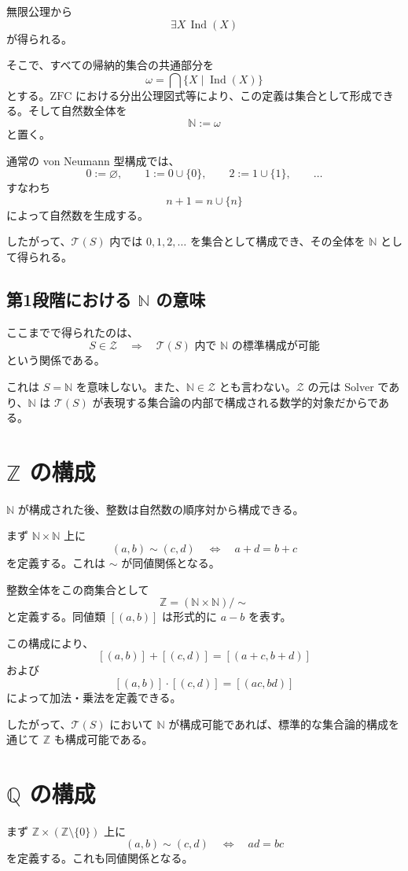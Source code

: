 \documentclass[a4paper,11pt]{article}
\newcommand{\ZFC}{\mathrm{ZFC}}
\begin{document}
無限公理から
\[
\exists X\,\operatorname{Ind}(X)
\]
が得られる。

そこで、すべての帰納的集合の共通部分を
\[
\omega=\bigcap\{X\mid\operatorname{Ind}(X)\}
\]
とする。$\ZFC$ における分出公理図式等により、この定義は集合として形成できる。そして自然数全体を
\[
\boxed{\mathbb{N}:=\omega}
\]
と置く。

通常の von Neumann 型構成では、
\[
0:=\varnothing,\qquad 1:=0\cup\{0\},\qquad 2:=1\cup\{1\},\qquad\ldots
\]
すなわち
\[
n+1=n\cup\{n\}
\]
によって自然数を生成する。

したがって、$\mathcal{T}(S)$ 内では $0,1,2,\ldots$ を集合として構成でき、その全体を $\mathbb{N}$ として得られる。

\subsection{第1段階における $\mathbb{N}$ の意味}
ここまでで得られたのは、
\[
S\in\mathcal{Z}\quad\Longrightarrow\quad\mathcal{T}(S)\text{ 内で }\mathbb{N}\text{ の標準構成が可能}
\]
という関係である。

これは $S=\mathbb{N}$ を意味しない。また、$\mathbb{N}\in\mathcal{Z}$ とも言わない。$\mathcal{Z}$ の元は Solver であり、$\mathbb{N}$ は $\mathcal{T}(S)$ が表現する集合論の内部で構成される数学的対象だからである。

\section{$\mathbb{Z}$ の構成}
$\mathbb{N}$ が構成された後、整数は自然数の順序対から構成できる。

まず $\mathbb{N}\times\mathbb{N}$ 上に
\[
(a,b)\sim(c,d)\quad\Longleftrightarrow\quad a+d=b+c
\]
を定義する。これは $\sim$ が同値関係となる。

整数全体をこの商集合として
\[
\boxed{\mathbb{Z}=(\mathbb{N}\times\mathbb{N})/{\sim}}
\]
と定義する。同値類 $[(a,b)]$ は形式的に $a-b$ を表す。

この構成により、
\[
[(a,b)]+[(c,d)]=[(a+c,b+d)]
\]
および
\[
[(a,b)]\cdot[(c,d)]=[(ac,bd)]
\]
によって加法・乗法を定義できる。

したがって、$\mathcal{T}(S)$ において $\mathbb{N}$ が構成可能であれば、標準的な集合論的構成を通じて $\mathbb{Z}$ も構成可能である。

\section{$\mathbb{Q}$ の構成}
まず $\mathbb{Z}\times(\mathbb{Z}\setminus\{0\})$ 上に
\[
(a,b)\sim(c,d)\quad\Longleftrightarrow\quad ad=bc
\]
を定義する。これも同値関係となる。
\end{document}
